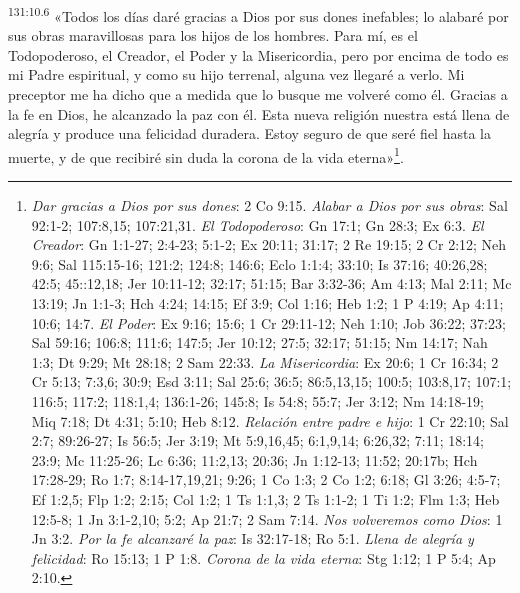 \par 
\textsuperscript{131:10.6} «Todos los días daré gracias a Dios por sus dones inefables; lo alabaré por sus obras maravillosas para los hijos de los hombres. Para mí, es el Todopoderoso, el Creador, el Poder y la Misericordia, pero por encima de todo es mi Padre espiritual, y como su hijo terrenal, alguna vez llegaré a verlo. Mi preceptor me ha dicho que a medida que lo busque me volveré como él. Gracias a la fe en Dios, he alcanzado la paz con él. Esta nueva religión nuestra está llena de alegría y produce una felicidad duradera. Estoy seguro de que seré fiel hasta la muerte, y de que recibiré sin duda la corona de la vida eterna»\footnote{\textit{Dar gracias a Dios por sus dones}: 2 Co 9:15. \textit{Alabar a Dios por sus obras}: Sal 92:1-2; 107:8,15; 107:21,31. \textit{El Todopoderoso}: Gn 17:1; Gn 28:3; Ex 6:3. \textit{El Creador}: Gn 1:1-27; 2:4-23; 5:1-2; Ex 20:11; 31:17; 2 Re 19:15; 2 Cr 2:12; Neh 9:6; Sal 115:15-16; 121:2; 124:8; 146:6; Eclo 1:1:4; 33:10; Is 37:16; 40:26,28; 42:5; 45::12,18; Jer 10:11-12; 32:17; 51:15; Bar 3:32-36; Am 4:13; Mal 2:11; Mc 13:19; Jn 1:1-3; Hch 4:24; 14:15; Ef 3:9; Col 1:16; Heb 1:2; 1 P 4:19; Ap 4:11; 10:6; 14:7. \textit{El Poder}: Ex 9:16; 15:6; 1 Cr 29:11-12; Neh 1:10; Job 36:22; 37:23; Sal 59:16; 106:8; 111:6; 147:5; Jer 10:12; 27:5; 32:17; 51:15; Nm 14:17; Nah 1:3; Dt 9:29; Mt 28:18; 2 Sam 22:33. \textit{La Misericordia}: Ex 20:6; 1 Cr 16:34; 2 Cr 5:13; 7:3,6; 30:9; Esd 3:11; Sal 25:6; 36:5; 86:5,13,15; 100:5; 103:8,17; 107:1; 116:5; 117:2; 118:1,4; 136:1-26; 145:8; Is 54:8; 55:7; Jer 3:12; Nm 14:18-19; Miq 7:18; Dt 4:31; 5:10; Heb 8:12. \textit{Relación entre padre e hijo}: 1 Cr 22:10; Sal 2:7; 89:26-27; Is 56:5; Jer 3:19; Mt 5:9,16,45; 6:1,9,14; 6:26,32; 7:11; 18:14; 23:9; Mc 11:25-26; Lc 6:36; 11:2,13; 20:36; Jn 1:12-13; 11:52; 20:17b; Hch 17:28-29; Ro 1:7; 8:14-17,19,21; 9:26; 1 Co 1:3; 2 Co 1:2; 6:18; Gl 3:26; 4:5-7; Ef 1:2,5; Flp 1:2; 2:15; Col 1:2; 1 Ts 1:1,3; 2 Ts 1:1-2; 1 Ti 1:2; Flm 1:3; Heb 12:5-8; 1 Jn 3:1-2,10; 5:2; Ap 21:7; 2 Sam 7:14. \textit{Nos volveremos como Dios}: 1 Jn 3:2. \textit{Por la fe alcanzaré la paz}: Is 32:17-18; Ro 5:1. \textit{Llena de alegría y felicidad}: Ro 15:13; 1 P 1:8. \textit{Corona de la vida eterna}: Stg 1:12; 1 P 5:4; Ap 2:10.}.

